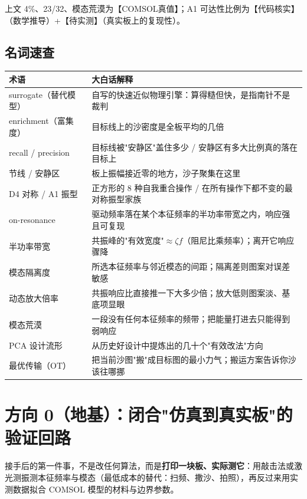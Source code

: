 \documentclass[11pt,a4paper]{article}
\begin{document}
上文 4\%、23/32、模态荒漠为【COMSOL真值】；A1 可达性比例为【代码核实】（数学推导）+【待实测】（真实板上的复现性）。

\subsection*{名词速查}

\begin{center}
\small
\begin{tabular}{@{}p{}p{}@{}}
\toprule
术语 & 大白话解释 \\
\midrule
surrogate（替代模型） & 自写的快速近似物理引擎：算得糙但快，是指南针不是裁判 \\
enrichment（富集度） & 目标线上的沙密度是全板平均的几倍 \\
recall / precision & 目标线被"安静区"盖住多少 / 安静区有多大比例真的落在目标上 \\
节线 / 安静区 & 板上振幅接近零的地方，沙子聚集在这里 \\
D4 对称 / A1 振型 & 正方形的 8 种自我重合操作 / 在所有操作下都不变的最对称振型家族 \\
on-resonance & 驱动频率落在某个本征频率的半功率带宽之内，响应强且可复现 \\
半功率带宽 & 共振峰的"有效宽度"$\approx \zeta f$（阻尼比乘频率）；离开它响应骤降 \\
模态隔离度 & 所选本征频率与邻近模态的间距；隔离差则图案对误差敏感 \\
动态放大倍率 & 共振响应比直接推一下大多少倍；放大低则图案淡、基底项显眼 \\
模态荒漠 & 一段没有任何本征频率的频带；把能量打进去只能得到弱响应 \\
PCA 设计流形 & 从历史好设计中提炼出的几十个"有效改法"方向 \\
最优传输（OT） & 把当前沙图"搬"成目标图的最小力气；搬运方案告诉你沙该往哪挪 \\
\bottomrule
\end{tabular}
\end{center}

\section{方向 0（地基）：闭合"仿真到真实板"的验证回路}

接手后的第一件事，不是改任何算法，而是\textbf{打印一块板、实际测它}：用敲击法或激光测振测本征频率与模态（最低成本的替代：扫频、撒沙、拍照），再反过来用实测数据拟合 COMSOL 模型的材料与边界参数。
\end{document}

